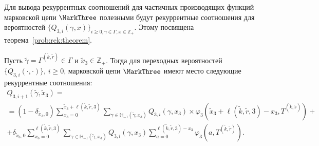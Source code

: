Для вывода рекуррентных соотношений для частичных производящих функций марковской цепи  ${\MarkThree}$ полезными будут рекуррентные соотношения для вероятностей $\{Q_{3, i}(\gamma, x)\}_{i\geqslant 0, \gamma \in \Gamma, x \in {\mathbb Z}_+}$. Этому посвящена теорема~\ref{prob:rek:theorem}.
\begin{theorem}
Пусть $\tilde{\gamma} =\Gamma^{(\tilde{k}, \tilde{r})}\in \Gamma$ и $\tilde{x}_3 \in {\mathbb Z}_+$. Тогда для переходных вероятностей $\{Q_{3, i}(\cdot, \cdot)\}$,  ${i\geqslant 0}$, марковской цепи $\MarkThree$ имеют место следующие рекуррентные соотношения:
\begin{multline}
Q_{3, i+1}(\tilde{\gamma}, \tilde{x}_3) =\\
=(1-\delta_{\tilde{x}_3, 0}) \sum_{x_3=0}^{\tilde{x}_3 +  \ell(\tilde{k}, \tilde{r}, 3)}\sum_{\gamma \in {\mathbb H}_{-1}(\tilde{\gamma}, x_3)} Q_{3, i}(\gamma, x_3) \times 
\varphi_3(\tilde{x}_3 + \ell(\tilde{k}, \tilde{r}, 3) - x_3, T^{(\tilde{k}, \tilde{r})}) + \\
+ \delta_{\tilde{x}_3, 0} \sum_{x_3=0}^{\ell(\tilde{k}, \tilde{r}, 3)}\sum_{\gamma \in {\mathbb H}_{-1}(\tilde{\gamma}, x_3)} Q_{3, i}(\gamma, x_3) \sum_{a=0}^{\ell(\tilde{k}, \tilde{r}, 3) - x_3} \varphi_3(a, T^{(\tilde{k}, \tilde{r})}).
\label{prob:rek}
\end{multline}
\label{prob:rek:theorem}
\end{theorem}
